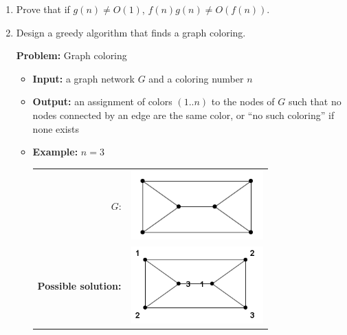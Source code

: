 \documentclass{article}
\begin{document}
\begin{enumerate}
\begin{proof}
Since $j(n) = \Omega(f(n))$, there exists $c_1, n_1$ such that                              $j(n) \geq c_1f(n)$ for all $n \geq n_1$.  
Similarly, $k(n) \geq c_2g(n)$ for all $n \geq n_2$, for some positive constants $c_2$ and $n_2$.
Since $j(n), k(n), f(n), g(n), c_1$, and $c_2$ are positive, we can multiply both sides of the inequalities, and we get
$j(n)k(n) \geq c_1c_2f(n)g(n)$ for all $n \geq n_3$. where $n_3 = \max\{n_1, n_2\}$.  Let $c_3 = c_1c_2$.  
Therefore, there exist positive constants $c_3$ and $n_3$ such that                                     $j(n)k(n) \geq c_3f(n)g(n)$ for all $n \geq n_3$,
so $j(n)k(n) = \Omega(f(n)g(n))$ by the definition of Big-Omega.
\end{proof}



\newpage
\item Prove that if $g(n) \neq O(1)$, $f(n)g(n) \neq O(f(n))$.




\newpage
\item Design a greedy algorithm that finds a graph coloring.

\textbf{Problem:}  Graph coloring
\begin{itemize}
\item \textbf{Input:}  a graph network $G$ and a coloring number $n$
\item \textbf{Output:}  an assignment of colors $(1..n)$ to the nodes of $G$ such that no nodes connected by an edge are the same color, or ``no such coloring'' if none exists
\item \textbf{Example:}  $n = 3$

\begin{tabular}{rl}
$G$: & \includegraphics[width=2in]{coloring-example.png}\\
\textbf{Possible solution:} & \includegraphics[width=2in]{coloring-soln.png}
\end{tabular}
\end{itemize}


\end{enumerate}
\end{document}
